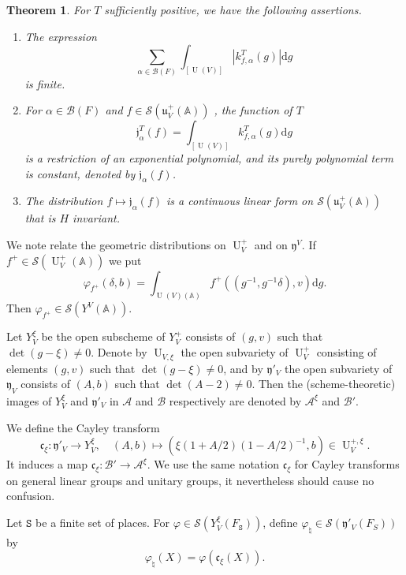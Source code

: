 \documentclass[letterpaper,11pt]{amsart}
\newcommand{\fc}{\mathfrak{c}}
\newcommand{\fu}{\mathfrak{u}}
\newcommand{\fy}{\mathfrak{y}}
\newcommand{\bA}{\mathbb{A}}
\newcommand{\cA}{\mathcal{A}}
\newcommand{\cB}{\mathcal{B}}
\newcommand{\cS}{\mathcal{S}}
\newcommand{\rd}{\mathrm{d}}
\newcommand{\tS}{\mathtt{S}}
\newcommand{\<}{\negthickspace}
\DeclareMathOperator{\U}{U}
\theoremstyle{definition}
\theoremstyle{plain}
\newtheorem{theorem}[definition]{Theorem}
\theoremstyle{remark}
\numberwithin{equation}{section}
\begin{document}
\begin{theorem}
For $T$ sufficiently positive, we have the following assertions.
\begin{enumerate}
    \item The expression
    \[ \sum_{\alpha \in \cB(F)} \int_{[\U(V)]}
    \left|  k^T_{f,\alpha}(g) \right| \rd g
    \]
    is finite.

    \item For $\alpha \in \cB(F)$ and $f \in \cS(\fu_V^+(\bA))$ , the
        function of $T$
        \[
	    \mathfrak{j}^{T}_\alpha(f) =
         \int_{[\U(V)]} k_{f,\alpha}^T(g) \rd g
        \]
    is a restriction of an exponential polynomial, and its purely
    polynomial term is constant, denoted by $\mathfrak{j}_{\alpha}(f)$.

\item The distribution $f \mapsto \mathfrak{j}_{\alpha}(f)$ is a continuous
    linear form on $\cS(\fu_V^+(\bA))$ that is $H$ invariant.
\end{enumerate}
\end{theorem}


We note relate the geometric distributions on $\U_V^+$ and on $\fy^V$. If
$f^+ \in \cS(\U_V^+(\bA))$ we put
    \begin{equation}    \label{eq:simplified_test_function_U}
    \varphi_{f^+}(\delta, b) = \int_{\U(V)(\bA)}
    f^+((g^{-1}, g^{-1} \delta ), v) \rd g.
    \end{equation}
Then $\varphi_{f^+} \in \cS(Y^V(\bA))$.

Let $Y_{V}^{\xi}$ be the open subscheme of $Y_V^+$ consists of $(g,v)$
such that $\det(g-\xi) \not= 0$. Denote by $\U_{V, \xi}$ the open subvariety
of $\U_V^+$ consisting of elements $(g, v)$ such that $\det(g - \xi) \not=0$,
and by $\fy'_{V}$ the open subvariety of $\fy_V$ consists of
$(A,b)$ such that $\det(A- 2) \ne 0$. Then the (scheme-theoretic) images of
$Y_{V}^{\xi}$ and $\fy'_{V}$ in $\cA$ and $\cB$ respectively are denoted by
$\cA^\xi$ and $\cB'$.

We define the Cayley transform
    \[
    \fc_\xi: \fy'_{V} \to Y_{V}^{\xi}, \quad
    (A,b) \mapsto \left( \xi (1+A/2)(1-A/2)^{-1},
    b \right) \in \U_V^{+, \xi}.
    \]
It induces a map $\fc_\xi: \cB' \to \cA^\xi$. We use the same notation $\fc_{\xi}$ for Cayley transforms on general linear groups and unitary groups, it nevertheless should cause no confusion.

Let $\tS$ be a finite set of places. For $\varphi \in \cS(Y_V^{ \xi}(F_\tS))$,
define $\varphi_\natural \in \cS(\fy'_V(F_S))$ by
\[
    \varphi_\natural(X) =  \varphi(\fc_\xi(X)).
\]
\end{document}
